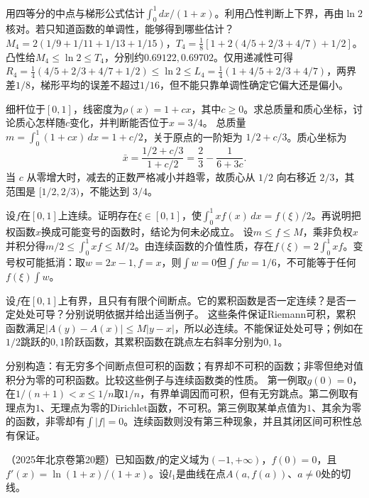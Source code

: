 用四等分的中点与梯形公式估计\(\int_0^1dx/(1+x)\)。利用凸性判断上下界，再由\(\ln2\)核对。若只知道函数的单调性，能够得到哪些估计？
\solutionanswer
\(M_4=2(1/9+1/11+1/13+1/15)\)，\(T_4=\frac18[1+2(4/5+2/3+4/7)+1/2]\)。凸性给\(M_4\le\ln2\le T_4\)，分别约\(0.69122,0.69702\)。仅用递减性可得\(R_4=\frac14(4/5+2/3+4/7+1/2)\le\ln2\le L_4=\frac14(1+4/5+2/3+4/7)\)，两界差\(1/8\)，梯形平均的误差不超过\(1/16\)，但不能只靠单调性确定它偏大还是偏小。


细杆位于\([0,1]\)，线密度为\(\rho(x)=1+cx\)，其中\(c\ge0\)。求总质量和质心坐标，讨论质心怎样随\(c\)变化，并判断能否位于\(x=3/4\)。
\solutionanswer
总质量 \(m=\int_0^1(1+cx)\,dx=1+c/2\)，关于原点的一阶矩为 \(1/2+c/3\)。质心坐标为
\[
 \bar x=\frac{1/2+c/3}{1+c/2}=\frac23-\frac1{6+3c}.
\]
当 \(c\) 从零增大时，减去的正数严格减小并趋零，故质心从 \(1/2\) 向右移近 \(2/3\)，其范围是 \([1/2,2/3)\)，不能达到 \(3/4\)。


设\(f\)在\([0,1]\)上连续。证明存在\(\xi\in[0,1]\)，使\(\int_0^1xf(x)\,dx=f(\xi)/2\)。再说明把权函数\(x\)换成可能变号的函数时，结论为何未必成立。
\solutionanswer
设\(m\le f\le M\)，乘非负权\(x\)并积分得\(m/2\le\int_0^1xf\le M/2\)。由连续函数的介值性质，存在\(f(\xi)=2\int_0^1xf\)。变号权可能抵消：取\(w=2x-1,f=x\)，则\(\int w=0\)但\(\int fw=1/6\)，不可能等于任何\(f(\xi)\int w\)。


设\(f\)在\([0,1]\)上有界，且只有有限个间断点。它的累积函数是否一定连续？是否一定处处可导？分别说明依据并给出适当例子。
\solutionanswer
这些条件保证Riemann可积，累积函数满足\(|A(y)-A(x)|\le M|y-x|\)，所以必连续。不能保证处处可导；例如在\(1/2\)跳跃的\(0,1\)阶跃函数，其累积函数在跳点左右斜率分别为\(0,1\)。


分别构造：有无穷多个间断点但可积的函数；有界却不可积的函数；非零但绝对值积分为零的可积函数。比较这些例子与连续函数类的性质。
\solutionanswer
第一例取\(g(0)=0\)，在\(1/(n+1)<x\le1/n\)取\(1/n\)，有界单调因而可积，但有无穷跳点。第二例取有理点为\(1\)、无理点为零的Dirichlet函数，不可积。第三例取某单点值为\(1\)、其余为零的函数，非零却有\(\int|f|=0\)。连续函数则没有第三种现象，并且其闭区间可积性总有保证。


（2025年北京卷第20题）已知函数\(f\)的定义域为\((-1,+\infty)\)，\(f(0)=0\)，且\(f'(x)=\ln(1+x)/(1+x)\)。设\(l_1\)是曲线在点\(A(a,f(a))\)、\(a\ne0\)处的切线。

